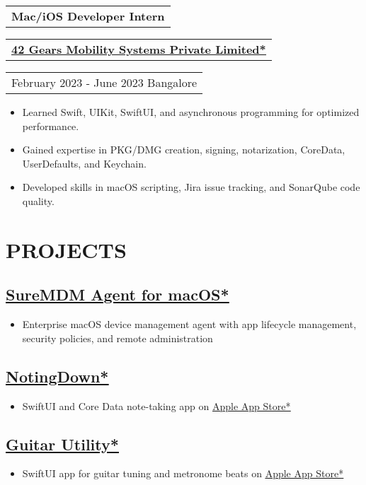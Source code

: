 \documentclass[10pt,a4paper]{moderncv}
\let\oldhref\href
\renewcommand{\href}[2]{\oldhref{#1}{\underline{#2}}}
\newcommand*{\experienceentry}[5][1.5mm]{
    \begin{tabularx}{\textwidth}{L}
        {\bfseries\large #2}
    \end{tabularx}
    \vspace{1mm}
    \begin{tabularx}{\textwidth}{L}
        {\bfseries #3}
    \end{tabularx}
    \vspace{1mm}
    \begin{tabularx}{\textwidth}{L}
        {\faCalendar\enspace #4 \faMapMarker\enspace #5}
    \end{tabularx}
    \par\addvspace{#1}
}
\begin{document}
\begin{minipage}[t]{0.60\textwidth}
\noindent\makebox[\linewidth]{\dotfill}
\vspace{2.0mm}

\experienceentry{Mac/iOS Developer Intern}{\href{https://www.42gears.com/}{42 Gears Mobility Systems Private Limited*}}{February 2023 - June 2023}{Bangalore}

\begin{itemize}
    \item Learned Swift, UIKit, SwiftUI, and asynchronous programming for optimized performance.
    \item Gained expertise in PKG/DMG creation, signing, notarization, CoreData, UserDefaults, and Keychain.
    \item Developed skills in macOS scripting, Jira issue tracking, and SonarQube code quality.
\end{itemize}

\section{PROJECTS}
\subsection{\href{https://www.42gears.com/products/mobile-device-management/suremdm-agent-for-macos-past-releases/}{SureMDM Agent for macOS*}}
\begin{itemize}
    \item Enterprise macOS device management agent with app lifecycle management, security policies, and remote administration
\end{itemize}

\subsection{\href{https://github.com/sachin6174/NotingDown}{NotingDown*}}
\begin{itemize}
    \item SwiftUI and Core Data note-taking app on \href{https://apps.apple.com/us/app/notingdown/id123456789}{Apple App Store*}
\end{itemize}

\subsection{\href{https://github.com/sachin6174/Guitar-Utility}{Guitar Utility*}}
\begin{itemize}
    \item SwiftUI app for guitar tuning and metronome beats on \href{https://apps.apple.com/us/app/guitar-utility/id6751228342}{Apple App Store*}
\end{itemize}


\end{minipage}
\end{document}
